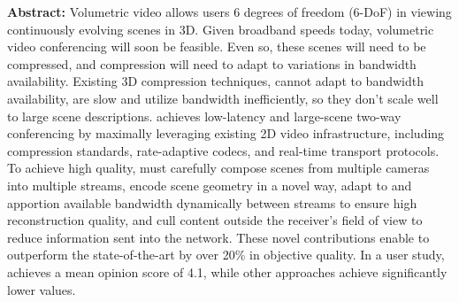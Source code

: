 {\bf Abstract:} 
%
Volumetric video allows users 6 degrees of freedom (6-DoF) in viewing continuously evolving scenes in 3D.
%
Given broadband speeds today, volumetric video conferencing will soon be feasible.
%
Even so, these scenes will need to be compressed, and compression will need to adapt to variations in bandwidth availability.
%
Existing 3D compression techniques, cannot adapt to bandwidth availability, are slow and utilize bandwidth inefficiently, so they don't scale well to large scene descriptions.
%
\sysname achieves low-latency and large-scene two-way conferencing by maximally leveraging existing 2D video infrastructure, including compression standards, rate-adaptive codecs, and real-time transport protocols.
%
To achieve high quality, \sysname{} must carefully compose scenes from multiple cameras into multiple streams, encode scene geometry in a novel way, adapt to and apportion available bandwidth dynamically between streams to ensure high reconstruction quality, and cull content outside the receiver's field of view to reduce information sent into the network.
%
These novel contributions enable \sysname{} to outperform the state-of-the-art by over 20\% in objective quality.
%
In a user study, \sysname{} achieves a mean opinion score of 4.1, while other approaches achieve significantly lower values.

